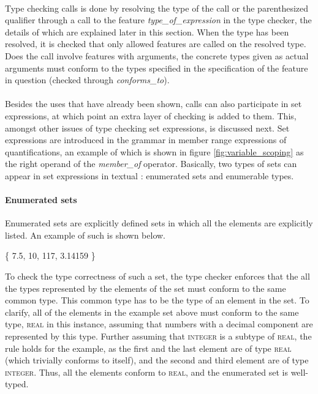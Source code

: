 \paragraph{}
Type checking calls is done by resolving the type of the call or the parenthesized qualifier through a call to the feature \textit{type\_of\_expression} in the type checker, the details of which are explained later in this section. When the type has been resolved, it is checked that only allowed features are called on the resolved type. Does the call involve features with arguments, the concrete types given as actual arguments must conform to the types specified in the specification of the feature in question (checked through \textit{conforms\_to}).
\paragraph{}
Besides the uses that have already been shown, calls can also participate in set expressions, at which point an extra layer of checking is added to them. This, amongst other issues of type checking set expressions, is discussed next.
\label{implementation-set-expressions}
Set expressions are introduced in the grammar in member range expressions of quantifications, an example of which is shown in figure \ref{fig:variable_scoping} as the right operand of the \textit{member\_of} operator. Basically, two types of sets can appear in set expressions in textual \bon{}: enumerated sets and enumerable types.
\paragraph{Enumerated sets}
Enumerated sets are explicitly defined sets in which all the elements are explicitly listed. An example of such is shown below.
{\footnotesize
\begin{center}
\{ 7.5,  10, 117, 3.14159 \}
\end{center}}
To check the type correctness of such a set, the type checker enforces that the all the types represented by the elements of the set must conform to the same common type. This common type has to be the type of an element in the set. To clarify, all of the elements in the example set above must conform to the same type, \textsc{real} in this instance, assuming that numbers with a decimal component are represented by this type. Further assuming that \textsc{integer} is a subtype of \textsc{real}, the rule holds for the example, as the first and the last element are of type \textsc{real} (which trivially conforms to itself), and the second and third element are of type \textsc{integer}. Thus, all the elements conform to \textsc{real}, and the enumerated set is well-typed.

